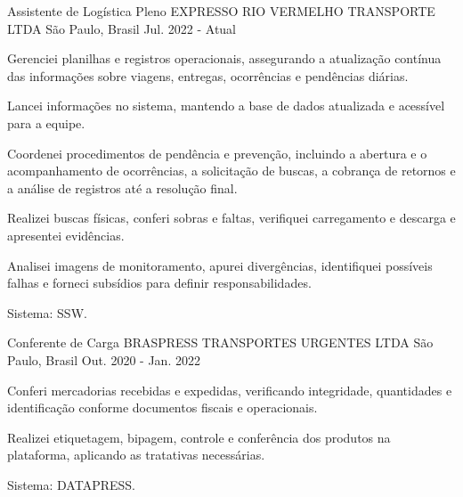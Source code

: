 

\begin{cventries}

  \cventry
    {Assistente de Logística Pleno} %
    {EXPRESSO RIO VERMELHO TRANSPORTE LTDA} %
    {São Paulo, Brasil} %
    {Jul. 2022 - Atual} %
    {
      \begin{cvitems} %
        \item {Gerenciei planilhas e registros operacionais, assegurando a atualização contínua das informações sobre viagens, entregas, ocorrências e pendências diárias.}
        \item {Lancei informações no sistema, mantendo a base de dados atualizada e acessível para a equipe.}
        \item {Coordenei procedimentos de pendência e prevenção, incluindo a abertura e o acompanhamento de ocorrências, a solicitação de buscas, a cobrança de retornos e a análise de registros até a resolução final.}
        \item {Realizei buscas físicas, conferi sobras e faltas, verifiquei carregamento e descarga e apresentei evidências.}
        \item {Analisei imagens de monitoramento, apurei divergências, identifiquei possíveis falhas e forneci subsídios para definir responsabilidades.}
        \item {Sistema: SSW.}
      \end{cvitems}
    }
  \break

  \cventry
    {Conferente de Carga} %
    {BRASPRESS TRANSPORTES URGENTES LTDA} %
    {São Paulo, Brasil} %
    {Out. 2020 - Jan. 2022} %
    {
      \begin{cvitems} %
        \item {Conferi mercadorias recebidas e expedidas, verificando integridade, quantidades e identificação conforme documentos fiscais e operacionais.}
        \item {Realizei etiquetagem, bipagem, controle e conferência dos produtos na plataforma, aplicando as tratativas necessárias.}
        \item {Sistema: DATAPRESS.}
      \end{cvitems}
    }
  \break


\end{cventries}
